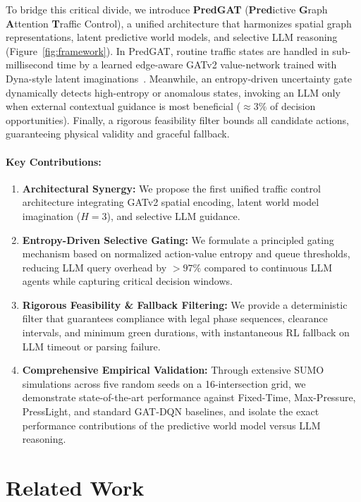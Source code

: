 \documentclass[11pt,a4paper]{article}
\begin{document}
To bridge this critical divide, we introduce \textbf{PredGAT} (\textbf{Pred}ictive \textbf{G}raph \textbf{A}ttention \textbf{T}raffic Control), a unified architecture that harmonizes spatial graph representations, latent predictive world models, and selective LLM reasoning (Figure~\ref{fig:framework}). In PredGAT, routine traffic states are handled in sub-millisecond time by a learned edge-aware GATv2 value-network trained with Dyna-style latent imaginations~\cite{sutton1991dyna,ha2018worldmodels}. Meanwhile, an entropy-driven uncertainty gate dynamically detects high-entropy or anomalous states, invoking an LLM only when external contextual guidance is most beneficial ($\approx 3\%$ of decision opportunities). Finally, a rigorous feasibility filter bounds all candidate actions, guaranteeing physical validity and graceful fallback.

\paragraph{Key Contributions:}
\begin{enumerate}
    \item \textbf{Architectural Synergy:} We propose the first unified traffic control architecture integrating GATv2 spatial encoding, latent world model imagination ($H=3$), and selective LLM guidance.
    \item \textbf{Entropy-Driven Selective Gating:} We formulate a principled gating mechanism based on normalized action-value entropy and queue thresholds, reducing LLM query overhead by $>97\%$ compared to continuous LLM agents while capturing critical decision windows.
    \item \textbf{Rigorous Feasibility \& Fallback Filtering:} We provide a deterministic filter that guarantees compliance with legal phase sequences, clearance intervals, and minimum green durations, with instantaneous RL fallback on LLM timeout or parsing failure.
    \item \textbf{Comprehensive Empirical Validation:} Through extensive SUMO simulations across five random seeds on a 16-intersection grid, we demonstrate state-of-the-art performance against Fixed-Time, Max-Pressure, PressLight, and standard GAT-DQN baselines, and isolate the exact performance contributions of the predictive world model versus LLM reasoning.
\end{enumerate}

\section{Related Work}
\label{sec:related}
\end{document}
